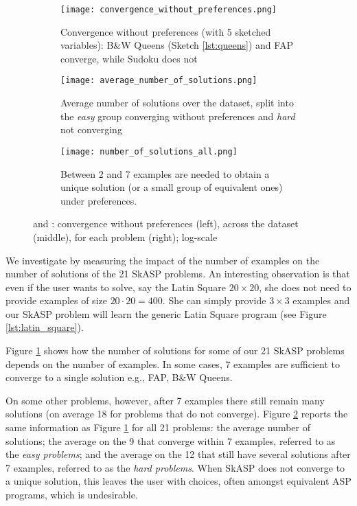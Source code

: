 \begin{figure*}[tb]
  \centering
  \begin{subfigure}[t]{0.325\textwidth}
   \texttt{[image: convergence\_without\_preferences.png]}
   \caption{Convergence without preferences (with 5 sketched variables): B\&W Queens (Sketch \ref{lst:queens}) and FAP converge, while Sudoku does not}
    \label{fig:convergence_without_preferences}
  \end{subfigure}
 \hfill
 \begin{subfigure}[t]{0.325\textwidth}
  \texttt{[image: average\_number\_of\_solutions.png]}
  \caption{Average number of solutions over the dataset, split into the \textit{easy} group converging without preferences and \textit{hard} not converging }
  \label{fig:preferences_effect}
  \end{subfigure}
\hfill
\begin{subfigure}[t]{0.325\textwidth}
  \texttt{[image: number\_of\_solutions\_all.png]}
  \caption{Between 2 and 7 examples are needed to obtain a unique solution (or a small group of equivalent ones) under preferences.}
  \label{fig:number_of_solutions}
  \end{subfigure}
  \caption{\qone and \qtwo: convergence without preferences (left), across the dataset (middle), for each problem (right); log-scale}%
\end{figure*}



We investigate \qone by measuring the impact of the number of examples 
on the number of solutions of the 21 SkASP problems. 
An interesting observation is that even if the user wants to 
solve, say the Latin Square $20\times 20$, she does not need to provide 
examples of size $20\cdot 20= 400$. She can simply provide $3\times 3$ examples 
and our SkASP problem will learn the generic 
Latin Square program (see Figure \ref{lst:latin_square}). 

Figure \ref{fig:convergence_without_preferences} shows how the number of solutions 
for some of our 21 SkASP problems depends on the number of examples. 
In some cases, 7 examples are sufficient 
to converge to a single solution e.g., FAP, B\&W Queens. 
%

On some other problems, however, after 7 examples there still remain 
many solutions (on average 18 for problems that do not converge). 
Figure \ref{fig:preferences_effect} reports the same information as Figure \ref{fig:convergence_without_preferences} for all 21 problems: the average number of solutions; the average on the 9 that 
converge within 7 examples, referred to as the \textit{easy problems}; and the average on the 12 that still have several 
solutions after 7 examples, referred to as the \textit{hard problems}. 
When SkASP  does not converge to a unique solution, this leaves 
the user with choices, often amongst equivalent ASP programs, which is undesirable.  

